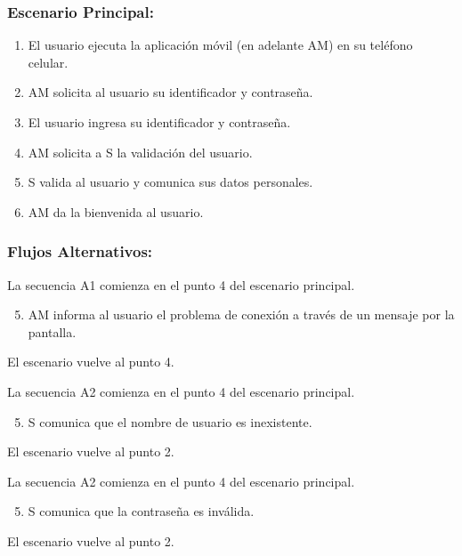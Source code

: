 \begin{framed}
\subsubsection{Escenario Principal: }

\begin{enumerate}
    \item El usuario ejecuta la aplicación móvil (en adelante AM) en su teléfono celular. 
    \item AM solicita al usuario su identificador y contraseña. 
    \item El usuario ingresa su identificador y contraseña. 
    \item AM solicita a S la validación del usuario. 
    \item S valida al usuario y comunica sus datos personales. 
    \item AM da la bienvenida al usuario. 
\end{enumerate}

\subsubsection{Flujos Alternativos: }

La secuencia A1 comienza en el punto 4 del escenario principal. 
\begin{enumerate}
    \setcounter{enumi}{4}
    \item AM informa al usuario el problema de conexión a través de un mensaje por la pantalla. 
\end{enumerate}
El escenario vuelve al punto 4. 


La secuencia A2 comienza en el punto 4 del escenario principal.
\begin{enumerate}
    \setcounter{enumi}{4}
        \item S comunica que el nombre de usuario es inexistente. 
\end{enumerate}
El escenario vuelve al punto 2. 


La secuencia A2 comienza en el punto 4 del escenario principal. 
\begin{enumerate}
    \setcounter{enumi}{4}
    \item S comunica que la contraseña es inválida. 
\end{enumerate}
El escenario vuelve al punto 2. 



\end{framed}
